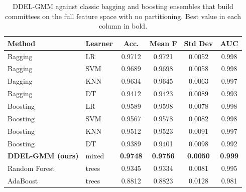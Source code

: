 \begin{table}[htbp]
	\begin{center}
		\caption{DDEL-GMM against classic bagging and boosting ensembles that build committees on the full feature space with no partitioning. Best value in each column in bold.}
		\label{tab:bagging_boosting}
		\begin{tabular}{|l|l|c|c|c|c|}
			\hline
			\textbf{Method} & \textbf{Learner} & \textbf{Acc.} & \textbf{Mean F} & \textbf{Std Dev} & \textbf{AUC} \\
			\hline
			Bagging & LR & 0.9712 & 0.9721 & 0.0052 & 0.998 \\
			Bagging & SVM & 0.9689 & 0.9698 & 0.0058 & 0.998 \\
			Bagging & KNN & 0.9634 & 0.9645 & 0.0063 & 0.997 \\
			Bagging & DT & 0.9412 & 0.9423 & 0.0089 & 0.993 \\
			Boosting & LR & 0.9589 & 0.9598 & 0.0078 & 0.998 \\
			Boosting & SVM & 0.9567 & 0.9578 & 0.0082 & 0.998 \\
			Boosting & KNN & 0.9512 & 0.9523 & 0.0091 & 0.997 \\
			Boosting & DT & 0.9389 & 0.9401 & 0.0098 & 0.992 \\
			\textbf{DDEL-GMM (ours)} & mixed & \textbf{0.9748} & \textbf{0.9756} & \textbf{0.0050} & \textbf{0.999} \\
			Random Forest & trees & 0.9345 & 0.9334 & 0.0081 & 0.995 \\
			AdaBoost & trees & 0.8812 & 0.8823 & 0.0128 & 0.981 \\
			\hline
		\end{tabular}
	\end{center}
\end{table}
